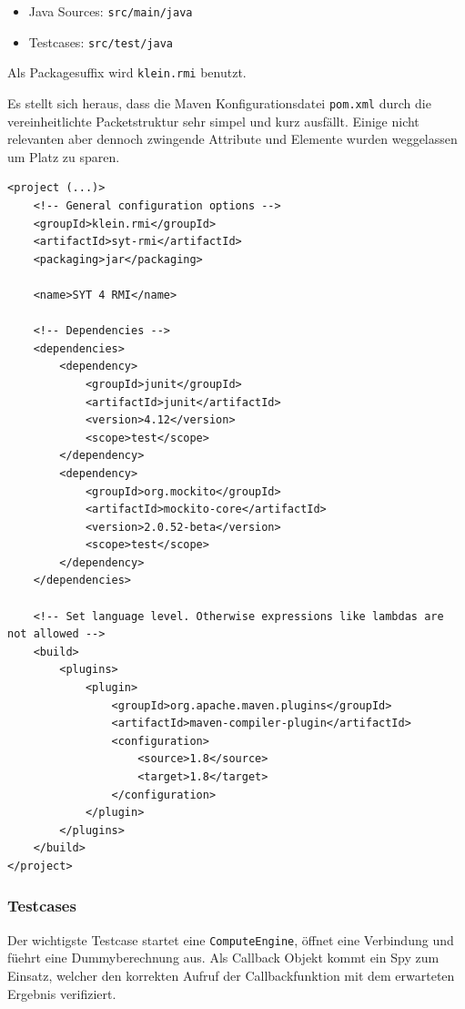 \begin{itemize}
    \item Java Sources: \texttt{src/main/java}
    \item Testcases: \texttt{src/test/java}
\end{itemize}

Als Packagesuffix wird \texttt{klein.rmi} benutzt.

Es stellt sich heraus, dass die Maven Konfigurationsdatei \texttt{pom.xml} durch die vereinheitlichte Packetstruktur sehr simpel und kurz ausf\"allt.
Einige nicht relevanten aber dennoch zwingende Attribute und Elemente wurden weggelassen um Platz zu sparen.

\begin{lstlisting}[style=XML, caption=Maven Konfigurationsdatei]
<project (...)>
    <!-- General configuration options -->
    <groupId>klein.rmi</groupId>
    <artifactId>syt-rmi</artifactId>
    <packaging>jar</packaging>

    <name>SYT 4 RMI</name>

    <!-- Dependencies -->
    <dependencies>
        <dependency>
            <groupId>junit</groupId>
            <artifactId>junit</artifactId>
            <version>4.12</version>
            <scope>test</scope>
        </dependency>
        <dependency>
            <groupId>org.mockito</groupId>
            <artifactId>mockito-core</artifactId>
            <version>2.0.52-beta</version>
            <scope>test</scope>
        </dependency>
    </dependencies>

    <!-- Set language level. Otherwise expressions like lambdas are not allowed -->
    <build>
        <plugins>
            <plugin>
                <groupId>org.apache.maven.plugins</groupId>
                <artifactId>maven-compiler-plugin</artifactId>
                <configuration>
                    <source>1.8</source>
                    <target>1.8</target>
                </configuration>
            </plugin>
        </plugins>
    </build>
</project>
\end{lstlisting}

\subsubsection{Testcases}
Der wichtigste Testcase startet eine \texttt{ComputeEngine}, \"offnet eine Verbindung und f\"uehrt eine Dummyberechnung aus.
Als Callback Objekt kommt ein Spy zum Einsatz, welcher den korrekten Aufruf der Callbackfunktion mit dem erwarteten Ergebnis verifiziert.

